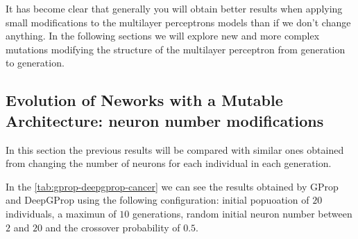 \documentclass[runningheads]{llncs}
\begin{document}
It has become clear that generally you will obtain better results when applying
small modifications to the multilayer perceptrons models than if we don't
change anything. In the following sections we will explore new and more complex
mutations modifying the structure of the multilayer perceptron from generation
to generation.


\subsection{Evolution of Neworks with a Mutable Architecture: neuron number modifications}


In this section the previous results will be compared with similar ones
obtained from changing the number of neurons for each individual in each
generation.


In the \autoref{tab:gprop-deepgprop-cancer} we can see the results obtained by
GProp and DeepGProp using the following configuration: initial popuoation of
$20$ individuals, a maximun of $10$ generations, random initial neuron number
between $2$ and $20$ and the crossover probability of $0.5$.
\end{document}
